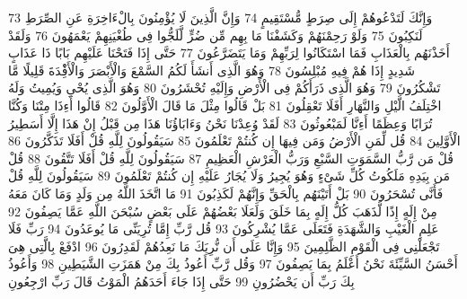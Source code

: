 \documentclass[20pt,a4paper]{article}
\begin{document}
{\tiny\colorbox{cl_aya}{73}} وَإِنَّكَ لَتَدْعُوهُمْ إِلَى صِرَطٍ مُّسْتَقِيمٍ
{\tiny\colorbox{cl_aya}{74}} وَإِنَّ الَّذِينَ لَا يُؤْمِنُونَ بِالْءَاخِرَةِ عَنِ الصِّرَطِ لَنَكِبُونَ
{\tiny\colorbox{cl_aya}{75}} وَلَوْ رَحِمْنَهُمْ وَكَشَفْنَا مَا بِهِم مِّن ضُرٍّ لَّلَجُّوا فِى طُغْيَنِهِمْ يَعْمَهُونَ
{\tiny\colorbox{cl_aya}{76}} وَلَقَدْ أَخَذْنَهُم بِالْعَذَابِ فَمَا اسْتَكَانُوا لِرَبِّهِمْ وَمَا يَتَضَرَّعُونَ
{\tiny\colorbox{cl_aya}{77}} حَتَّى إِذَا فَتَحْنَا عَلَيْهِم بَابًا ذَا عَذَابٍ شَدِيدٍ إِذَا هُمْ فِيهِ مُبْلِسُونَ
{\tiny\colorbox{cl_aya}{78}} وَهُوَ الَّذِى أَنشَأَ لَكُمُ السَّمْعَ وَالْأَبْصَرَ وَالْأَفِْٔدَةَ قَلِيلًا مَّا تَشْكُرُونَ
{\tiny\colorbox{cl_aya}{79}} وَهُوَ الَّذِى ذَرَأَكُمْ فِى الْأَرْضِ وَإِلَيْهِ تُحْشَرُونَ
{\tiny\colorbox{cl_aya}{80}} وَهُوَ الَّذِى يُحْىِ وَيُمِيتُ وَلَهُ اخْتِلَفُ الَّيْلِ وَالنَّهَارِ أَفَلَا تَعْقِلُونَ
{\tiny\colorbox{cl_aya}{81}} بَلْ قَالُوا مِثْلَ مَا قَالَ الْأَوَّلُونَ
{\tiny\colorbox{cl_aya}{82}} قَالُوا أَءِذَا مِتْنَا وَكُنَّا تُرَابًا وَعِظَمًا أَءِنَّا لَمَبْعُوثُونَ
{\tiny\colorbox{cl_aya}{83}} لَقَدْ وُعِدْنَا نَحْنُ وَءَابَاؤُنَا هَذَا مِن قَبْلُ إِنْ هَذَا إِلَّا أَسَطِيرُ الْأَوَّلِينَ
{\tiny\colorbox{cl_aya}{84}} قُل لِّمَنِ الْأَرْضُ وَمَن فِيهَا إِن كُنتُمْ تَعْلَمُونَ
{\tiny\colorbox{cl_aya}{85}} سَيَقُولُونَ لِلَّهِ قُلْ أَفَلَا تَذَكَّرُونَ
{\tiny\colorbox{cl_aya}{86}} قُلْ مَن رَّبُّ السَّمَوَتِ السَّبْعِ وَرَبُّ الْعَرْشِ الْعَظِيمِ
{\tiny\colorbox{cl_aya}{87}} سَيَقُولُونَ لِلَّهِ قُلْ أَفَلَا تَتَّقُونَ
{\tiny\colorbox{cl_aya}{88}} قُلْ مَن بِيَدِهِ مَلَكُوتُ كُلِّ شَىْءٍ وَهُوَ يُجِيرُ وَلَا يُجَارُ عَلَيْهِ إِن كُنتُمْ تَعْلَمُونَ
{\tiny\colorbox{cl_aya}{89}} سَيَقُولُونَ لِلَّهِ قُلْ فَأَنَّى تُسْحَرُونَ
{\tiny\colorbox{cl_aya}{90}} بَلْ أَتَيْنَهُم بِالْحَقِّ وَإِنَّهُمْ لَكَذِبُونَ
{\tiny\colorbox{cl_aya}{91}} مَا اتَّخَذَ اللَّهُ مِن وَلَدٍ وَمَا كَانَ مَعَهُ مِنْ إِلَهٍ إِذًا لَّذَهَبَ كُلُّ إِلَهٍ بِمَا خَلَقَ وَلَعَلَا بَعْضُهُمْ عَلَى بَعْضٍ سُبْحَنَ اللَّهِ عَمَّا يَصِفُونَ
{\tiny\colorbox{cl_aya}{92}} عَلِمِ الْغَيْبِ وَالشَّهَدَةِ فَتَعَلَى عَمَّا يُشْرِكُونَ
{\tiny\colorbox{cl_aya}{93}} قُل رَّبِّ إِمَّا تُرِيَنِّى مَا يُوعَدُونَ
{\tiny\colorbox{cl_aya}{94}} رَبِّ فَلَا تَجْعَلْنِى فِى الْقَوْمِ الظَّلِمِينَ
{\tiny\colorbox{cl_aya}{95}} وَإِنَّا عَلَى أَن نُّرِيَكَ مَا نَعِدُهُمْ لَقَدِرُونَ
{\tiny\colorbox{cl_aya}{96}} ادْفَعْ بِالَّتِى هِىَ أَحْسَنُ السَّيِّئَةَ نَحْنُ أَعْلَمُ بِمَا يَصِفُونَ
{\tiny\colorbox{cl_aya}{97}} وَقُل رَّبِّ أَعُوذُ بِكَ مِنْ هَمَزَتِ الشَّيَطِينِ
{\tiny\colorbox{cl_aya}{98}} وَأَعُوذُ بِكَ رَبِّ أَن يَحْضُرُونِ
{\tiny\colorbox{cl_aya}{99}} حَتَّى إِذَا جَاءَ أَحَدَهُمُ الْمَوْتُ قَالَ رَبِّ ارْجِعُونِ
\end{document}
